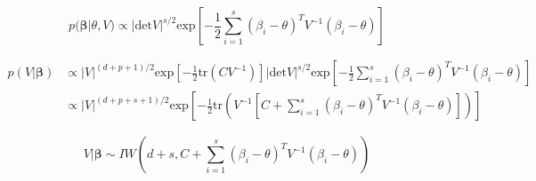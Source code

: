 \documentclass[10pt]{article}
\begin{document}
    $$p(\mathbf{\beta} | \theta, V) \propto | \text{det} V |^{s/2} \text{exp}\left[-\frac{1}{2} \sum_{i=1}^s (\beta_i - \theta)^T V^{-1} (\beta_i - \theta) \right] $$

    \begin{align*}
        p(V|\mathbf{\beta}) &\propto |V|^{(d+p+1)/2} \text{exp}\left[-\frac{1}{2} \text{tr}(C V^{-1}) \right] | \text{det} V |^{s/2} \text{exp}\left[-\frac{1}{2} \sum_{i=1}^s (\beta_i - \theta)^T V^{-1} (\beta_i - \theta) \right] \\
        &\propto |V|^{(d+p+s+1)/2} \text{exp}\left[-\frac{1}{2} \text{tr}\left(V^{-1}\left[C + \sum_{i=1}^s(\beta_i - \theta)^T V^{-1} (\beta_i - \theta) \right]\right) \right]
    \end{align*}

    $$V|\mathbf{\beta} \sim IW\left( d+ s, C + \sum_{i=1}^s(\beta_i - \theta)^T V^{-1} (\beta_i - \theta) \right)$$
\end{document}
